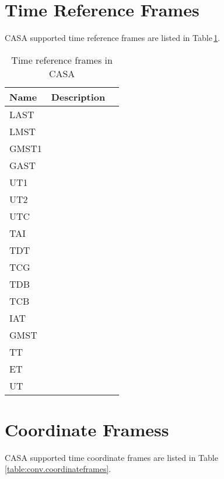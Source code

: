 \section{Time Reference Frames}
\label{section:conv.time}

CASA supported time reference frames are listed in Table\,\ref{table:conv.timeframes}.

\begin{table}[htb]
\caption{Time reference frames in CASA \label{table:conv.timeframes}}
\begin{center}
\begin{tabular}{lll}
Name & Description\\
\hline

LAST &   \\
LMST &   \\
GMST1 &   \\
GAST &   \\
UT1 &   \\
UT2 &   \\
UTC &   \\
TAI &   \\
TDT &   \\
TCG &   \\
TDB &   \\
TCB &   \\
IAT &   \\
GMST &   \\
TT &   \\
ET &   \\
UT &   \\
\end{tabular}
\end{center}
\end{table}




\section{Coordinate Framess}
\label{section:conv.coordinateframes}

CASA supported time coordinate frames are listed in Table\,\ref{table:conv.coordinateframes}.

